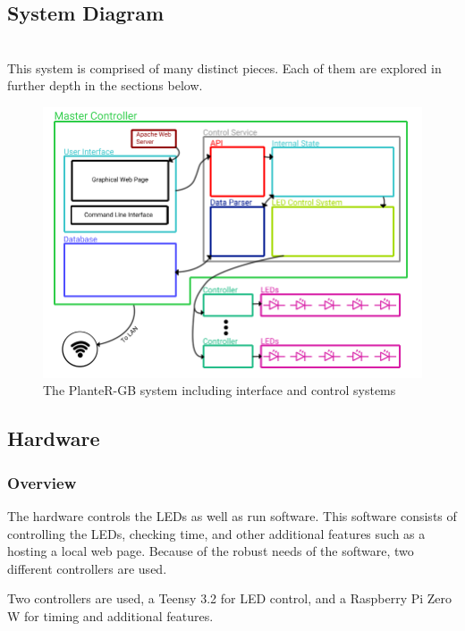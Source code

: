 \documentclass[onecolumn, draftclsnofoot,10pt, compsoc]{IEEEtran}
\begin{document}
		\subsection{System Diagram}

		\noindent \\This system is comprised of many distinct pieces. Each of them are explored in further depth in the sections below.

		\begin{center}
			\begin{figure}[H]
				\includegraphics[width=\linewidth]{systemDiagrams/systemdiag.png}
				\caption{The PlanteR-GB system including interface and control systems}
				\label{fig:systemDiagram}
			\end{figure}
		\end{center}

		\subsection{Hardware}
			\subsubsection{Overview}
			\noindent The hardware controls the LEDs as well as run software. This software
			consists of controlling the LEDs, checking time, and other additional
			features such as a hosting a local web page. Because of the robust needs of
			the software, two different controllers are used.

			\noindent Two controllers are used, a Teensy 3.2 for LED control, and a Raspberry Pi Zero W for timing
			and additional features.
\end{document}
